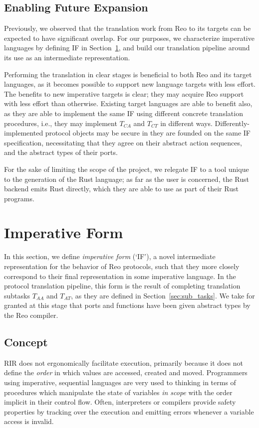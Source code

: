 \subsection{Enabling Future Expansion}
Previously, we observed that the translation work from Reo to its targets can be expected to have significant overlap. For our purposes, we characterize imperative languages by defining IF in Section~\ref{sec:imperative_form_sec}, and build our translation pipeline around its use as an intermediate representation.

Performing the translation in clear stages is beneficial to both Reo and its target languages, as it becomes possible to support new language targets with less effort. The benefits to new imperative targets is clear; they may acquire Reo support with less effort than otherwise. Existing target languages are able to benefit also, as they are able to implement the same IF using different concrete translation procedures, i.e., they may implement $T_{CA}$ and $T_{CT}$ in different ways. Differently-implemented protocol objects may be secure in they are founded on the same IF specification, necessitating that they agree on their abstract action sequences, and the abstract types of their ports.

For the sake of limiting the scope of the project, we relegate IF to a tool unique to the generation of the Rust language; as far as the user is concerned, the Rust backend emits Rust directly, which they are able to use as part of their Rust programs. 

\section{Imperative Form}
\label{sec:imperative_form_sec}
In this section, we define \textit{imperative form} (`IF'), a novel intermediate representation for the behavior of Reo protocols, such that they more closely correspond to their final representation in some imperative language. In the protocol translation pipeline, this form is the result of completing translation subtasks $T_{AA}$ and $T_{AT}$, as they are defined in Section~\ref{sec:sub_tasks}. We take for granted at this stage that ports and functions have been given abstract types by the Reo compiler.

\subsection{Concept}
RIR does not ergonomically facilitate execution, primarily because it does not define the \textit{order} in which values are accessed, created and moved. Programmers using imperative, sequential languages are very used to thinking in terms of procedures which manipulate the state of variables \textit{in scope} with the order implicit in their control flow. Often, interpreters or compilers provide safety properties by tracking over the execution and emitting errors whenever a variable access is invalid.

